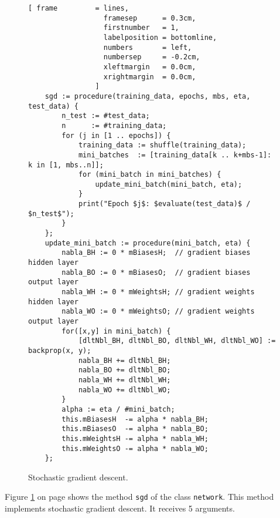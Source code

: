 \begin{figure}[!ht]
\centering
\begin{Verbatim}[ frame         = lines, 
                  framesep      = 0.3cm, 
                  firstnumber   = 1,
                  labelposition = bottomline,
                  numbers       = left,
                  numbersep     = -0.2cm,
                  xleftmargin   = 0.0cm,
                  xrightmargin  = 0.0cm,
                ]
    sgd := procedure(training_data, epochs, mbs, eta, test_data) {
        n_test := #test_data;         
        n      := #training_data;
        for (j in [1 .. epochs]) {
            training_data := shuffle(training_data);
            mini_batches  := [training_data[k .. k+mbs-1]: k in [1, mbs..n]];
            for (mini_batch in mini_batches) {
                update_mini_batch(mini_batch, eta);
            }
            print("Epoch $j$: $evaluate(test_data)$ / $n_test$");
        }
    };
    update_mini_batch := procedure(mini_batch, eta) {
        nabla_BH := 0 * mBiasesH;  // gradient biases hidden layer
        nabla_BO := 0 * mBiasesO;  // gradient biases output layer
        nabla_WH := 0 * mWeightsH; // gradient weights hidden layer
        nabla_WO := 0 * mWeightsO; // gradient weights output layer
        for([x,y] in mini_batch) {
            [dltNbl_BH, dltNbl_BO, dltNbl_WH, dltNbl_WO] := backprop(x, y);
            nabla_BH += dltNbl_BH;
            nabla_BO += dltNbl_BO;
            nabla_WH += dltNbl_WH;
            nabla_WO += dltNbl_WO;
        }        
        alpha := eta / #mini_batch;
        this.mBiasesH  -= alpha * nabla_BH;
        this.mBiasesO  -= alpha * nabla_BO;
        this.mWeightsH -= alpha * nabla_WH;
        this.mWeightsO -= alpha * nabla_WO;
    };
\end{Verbatim}
\vspace*{-0.3cm}
\caption{Stochastic gradient descent.}
\label{fig:nn.stlx:sgd}
\end{figure}
Figure \ref{fig:nn.stlx:sgd} on page \pageref{fig:nn.stlx:sgd} shows the method \texttt{sgd} of the class
\texttt{network}.  This method implements stochastic gradient descent.   It receives 5 arguments.
